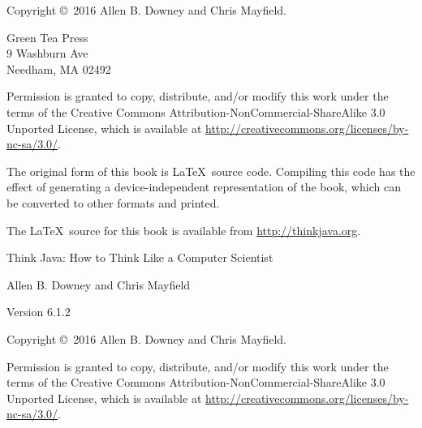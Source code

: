 \documentclass[12pt]{book}
\newcommand{\thetitle}{Think Java}
\newcommand{\thesubtitle}{How to Think Like a Computer Scientist}
\newcommand{\theauthors}{Allen B. Downey and Chris Mayfield}
\newcommand{\theversion}{6.1.2}
\theoremstyle{exercise}
\begin{document}
\begin{latexonly}
\newpage
\thispagestyle{empty}

Copyright \copyright ~2016 \theauthors.

\vspace{0.2in}

\begin{flushleft}
Green Tea Press \\
9 Washburn Ave \\
Needham, MA 02492
\end{flushleft}

Permission is granted to copy, distribute, and/or modify this work under the terms of the Creative Commons Attribution-NonCommercial-ShareAlike 3.0 Unported License, which is available at \url{http://creativecommons.org/licenses/by-nc-sa/3.0/}.

The original form of this book is \LaTeX\ source code.
Compiling this code has the effect of generating a device-independent representation of the book, which can be converted to other formats and printed.

The \LaTeX\ source for this book is available from \url{http://thinkjava.org}.


\cleardoublepage
\setcounter{tocdepth}{1}
\tableofcontents

\end{latexonly}


\begin{htmlonly}

\vspace{1em}

{\Large \thetitle: \thesubtitle}

{\large \theauthors}

Version \theversion

\vspace{1em}

Copyright \copyright ~2016 \theauthors.

Permission is granted to copy, distribute, and/or modify this work under the terms of the Creative Commons Attribution-NonCommercial-ShareAlike 3.0 Unported License, which is available at \url{http://creativecommons.org/licenses/by-nc-sa/3.0/}.

\vspace{1em}

\end{htmlonly}
\end{document}
